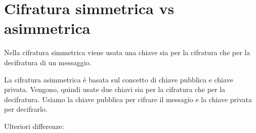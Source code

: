 


\section{Cifratura simmetrica vs asimmetrica} %

\textsf{\small Nella cifratura simmetrica viene usata una chiave sia per la cifratura che per la decifratura di un messaggio.}

\textsf{\small La cifratura asimmetrica è basata sul concetto di chiave pubblica e chiave privata. Vengono, quindi usate due chiavi sia per la cifratura che per la decifratura. Usiamo la chiave pubblica per cifrare il messagio e la chiave privata per decifrarlo.} %

\textsf{\small Ulteriori differenze: }

